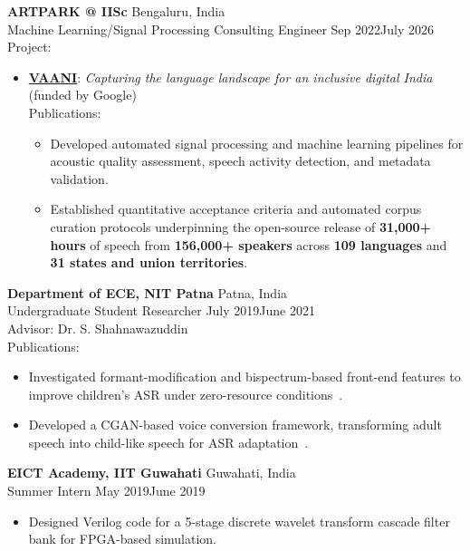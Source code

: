 \documentclass[letterpaper,11pt]{article}
\begin{document}
\textbf{ARTPARK @ IISc} \hfill Bengaluru, India\\
Machine Learning/Signal Processing Consulting Engineer \hfill Sep 2022\textendash July 2026 \\
Project: 
\begin{itemize}
\item \href{https://vaani.iisc.ac.in/}{\textbf{VAANI}}: \textit{Capturing the language landscape for an inclusive digital India} (funded by Google) \\
  Publications: \cite{pulikodan2026vaani}
\begin{itemize}
  \item Developed automated signal processing and machine learning pipelines for acoustic quality assessment, speech activity detection, and metadata validation.
  \item Established quantitative acceptance criteria and automated corpus curation protocols underpinning the open-source release of \textbf{31{,}000+ hours} of speech from \textbf{156{,}000+ speakers} across \textbf{109 languages} and \textbf{31 states and union territories}.
\end{itemize}
\end{itemize}

\textbf{Department of ECE, NIT Patna} \hfill Patna, India\\
Undergraduate Student Researcher \hfill July 2019\textendash June 2021 \\
Advisor: Dr. S. Shahnawazuddin \\
Publications: ~\cite{Syed2021_APAC, Syed2021_DSP}
\begin{itemize}
  \item Investigated formant-modification and bispectrum-based front-end features to improve children’s ASR under zero-resource conditions~\cite{Syed2021_APAC}.
  \item Developed a CGAN-based voice conversion framework, transforming adult speech into child-like speech for ASR adaptation~\cite{Syed2021_DSP}.
\end{itemize}

\textbf{EICT Academy, IIT Guwahati} \hfill Guwahati, India\\
Summer Intern \hfill May 2019\textendash June 2019 \\
\begin{itemize}
  \item Designed Verilog code for a 5-stage discrete wavelet transform cascade filter bank for FPGA-based simulation.
\end{itemize}
\end{document}

